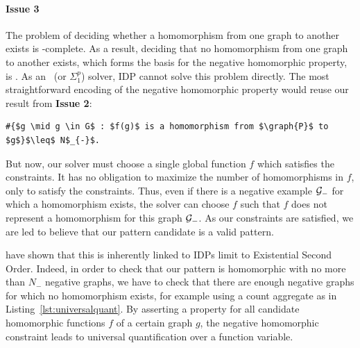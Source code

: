 \paragraph{Issue 3} The problem of deciding whether a homomorphism from one graph to another exists is \NP-complete.
As a result, deciding that no homomorphism from one graph to another exists, which forms the basis for the negative homomorphic property, is \coNP.
As an \NP\ (or $\Sigma^{p}_{1}$) solver, IDP cannot solve this problem directly.
The most straightforward encoding of the negative homomorphic property would reuse our result from \textbf{Issue 2}:
\begin{center}
\begin{minipage}{0.61\linewidth}
\begin{lstlisting}[mathescape]
#{$g \mid g \in G$ : $f(g)$ is a homomorphism from $\graph{P}$ to $g$}$\leq$ N$_{-}$.
\end{lstlisting}
\end{minipage}
\end{center}
But now, our solver must choose a single global function $f$ which satisfies the constraints.
It has no obligation to maximize the number of homomorphisms in $f$, only to satisfy the constraints.
Thus, even if there is a negative example $\mathcal{G}_{-}$ for which a homomorphism exists, the solver can choose $f$ such that $f$ does not represent a homomorphism for this graph $\mathcal{G}_{-}$.
As our constraints are satisfied, we are led to believe that our pattern candidate is a valid pattern.

\citep{} have shown that this is inherently linked to IDPs limit to Existential Second Order.
Indeed, in order to check that our pattern  is homomorphic with no more than $N_{-}$ negative graphs, we have to check that there are enough negative graphs for which no homomorphism exists, for example using a count aggregate as in Listing~\ref{lst:universalquant}.
By asserting a property for all candidate homomorphic functions $f$ of a certain graph $g$, the negative homomorphic constraint leads to universal quantification over a function variable.

